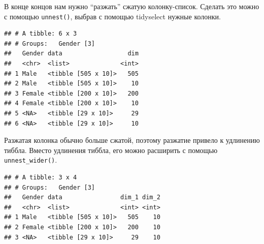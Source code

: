\documentclass[]{book}
\newenvironment{Shaded}{\begin{snugshade}}{\end{snugshade}}
\newcommand{\KeywordTok}[1]{\textcolor[rgb]{0.13,0.29,0.53}{\textbf{#1}}}
\newcommand{\DataTypeTok}[1]{\textcolor[rgb]{0.13,0.29,0.53}{#1}}
\newcommand{\StringTok}[1]{\textcolor[rgb]{0.31,0.60,0.02}{#1}}
\newcommand{\OperatorTok}[1]{\textcolor[rgb]{0.81,0.36,0.00}{\textbf{#1}}}
\newcommand{\NormalTok}[1]{#1}
\begin{document}
В конце концов нам нужно ``разжать'' сжатую колонку-список. Сделать это
можно с помощью \texttt{unnest()}, выбрав с помощью tidyselect нужные
колонки.

\begin{Shaded}
\end{Shaded}

\begin{verbatim}
## # A tibble: 6 x 3
## # Groups:   Gender [3]
##   Gender data                  dim
##   <chr>  <list>              <int>
## 1 Male   <tibble [505 x 10]>   505
## 2 Male   <tibble [505 x 10]>    10
## 3 Female <tibble [200 x 10]>   200
## 4 Female <tibble [200 x 10]>    10
## 5 <NA>   <tibble [29 x 10]>     29
## 6 <NA>   <tibble [29 x 10]>     10
\end{verbatim}

Разжатая колонка обычно больше сжатой, поэтому разжатие привело к
удлинению тиббла. Вместо удлинения тиббла, его можно расширить с помощью
\texttt{unnest\_wider()}.

\begin{Shaded}
\end{Shaded}

\begin{verbatim}
## # A tibble: 3 x 4
## # Groups:   Gender [3]
##   Gender data                dim_1 dim_2
##   <chr>  <list>              <int> <int>
## 1 Male   <tibble [505 x 10]>   505    10
## 2 Female <tibble [200 x 10]>   200    10
## 3 <NA>   <tibble [29 x 10]>     29    10
\end{verbatim}
\end{document}
